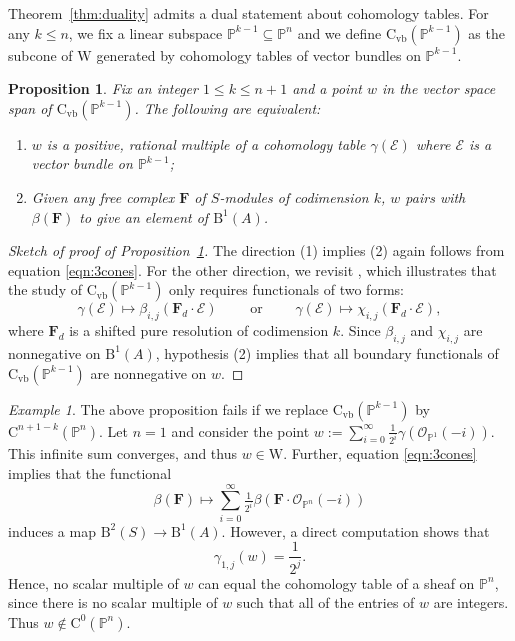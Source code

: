 \documentclass[12pt]{amsart}
\newtheorem{prop}[lemma]{Proposition}
\theoremstyle{definition}
\theoremstyle{remark}
\newtheorem{example}[lemma]{Example}
\newcommand{\PP}{\mathbb{P}}
\newcommand{\WW}{\mathrm{W}}
\newcommand{\cO}{\mathcal{O}}
\newcommand{\cE}{\mathcal{E}}
\newcommand{\FF}{\mathbf{F}}
\newcommand{\CQ}{\mathrm{C}}
\newcommand{\CvbQ}{\mathrm{C}_{\text{vb}}}
\newcommand{\BBQ}{\mathrm{B}}
\begin{document}
Theorem~\ref{thm:duality}  admits a dual statement about cohomology tables.  For any $k\leq  n$, we fix a linear subspace $\PP^{k-1}\subseteq \PP^n$ and we define $\CvbQ(\PP^{k-1})$ as the subcone of $\WW$ generated by cohomology tables of vector bundles on $\PP^{k-1}$.
\begin{prop}\label{prop:other}
Fix an integer $1\leq k\leq n+1$ and a point $w$ in the vector space span of $\CvbQ(\PP^{k-1})$.   The following are equivalent:
\begin{enumerate}
	\item   $w$ is a positive, rational multiple of a cohomology table $\gamma(\cE)$ where $\cE$ is a vector bundle on $\PP^{k-1}$;
	\item  Given any free complex $\FF$ of $S$-modules of codimension $k$, $w$ pairs with $\beta(\FF)$ to give an element of $\BBQ^1(A)$.
\end{enumerate}
\end{prop}
\begin{proof}[Sketch of proof of Proposition~\ref{prop:other}]
The direction (1) implies (2) again follows from equation \eqref{eqn:3cones}.  For the other direction, we revisit \cite[Proof of Theorem~0.5]{eis-schrey1}, which illustrates that the study of $\CvbQ(\PP^{k-1})$ only requires functionals of two forms:
\[
\gamma(\cE)\mapsto\beta_{i,j}(\FF_d\cdot \cE) \qquad \text{ or } \qquad \gamma(\cE)\mapsto\chi_{i,j}(\FF_d\cdot \cE),
\]
where $\FF_d$ is a shifted pure resolution of codimension $k$.  Since $\beta_{i,j}$ and $\chi_{i,j}$ are nonnegative on $\BBQ^1(A)$, hypothesis (2) implies that all boundary functionals of $\CvbQ(\PP^{k-1})$ are nonnegative on $w$.
\end{proof}


\begin{example}\label{rmk:issues}
The above proposition fails if we replace $\CvbQ(\PP^{k-1})$ by $\CQ^{n+1-k}(\PP^n)$.  
Let $n=1$ and consider the point $w:=\sum_{i=0}^\infty \frac{1}{2^i} \gamma(\cO_{\PP^1}(-i))$.  
This infinite sum converges, and thus $w\in \WW$.  Further, equation \eqref{eqn:3cones} implies that the functional
\[
\beta(\FF)\mapsto \sum_{i=0}^\infty \tfrac{1}{2^i} \beta(\FF\cdot \cO_{\PP^n}(-i))
\]
induces a map $\BBQ^{2}(S)\to \BBQ^1(A)$.  However, a direct computation shows that
\[
\gamma_{1,j}(w)=\frac{1}{2^{j}}.
\]
Hence, no scalar multiple of $w$ can equal the cohomology table of a sheaf on $\PP^n$, since there is no scalar multiple of $w$ such that all of the entries of $w$ are integers.  Thus $w\notin \CQ^0(\PP^n)$.
\end{example}
\end{document}
